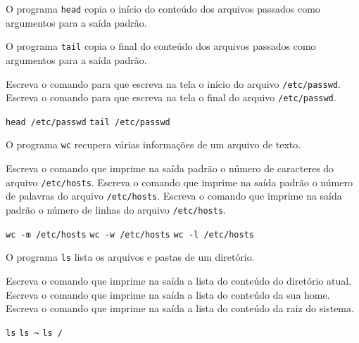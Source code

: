 \begin{Exercise}[label={0015}, difficulty={1}, origin={bash}]
  O programa \lstinline+head+ copia o início do conteúdo dos arquivos passados
  como argumentos para a saída padrão.

  O programa \lstinline+tail+ copia o final do conteúdo dos arquivos passados
  como argumentos para a saída padrão.

  \Question Escreva o comando para que escreva na tela o início do arquivo
  \lstinline+/etc/passwd+.
  \Question Escreva o comando para que escreva na tela o final do arquivo
  \lstinline+/etc/passwd+.
\end{Exercise}
\begin{Answer}[ref={0015}]
  \Question \lstinline+head /etc/passwd+
  \Question \lstinline+tail /etc/passwd+
\end{Answer}

\begin{Exercise}[label={0016}, difficulty={1}, origin={bash}]
  O programa \lstinline+wc+ recupera várias informações de um arquivo de texto.

  \Question Escreva o comando que imprime na saída padrão o número de
  caracteres do arquivo \lstinline+/etc/hosts+.
  \Question Escreva o comando que imprime na saída padrão o número de palavras
  do arquivo \lstinline+/etc/hosts+.
  \Question Escreva o comando que imprime na saída padrão o número de linhas
  do arquivo \lstinline+/etc/hosts+.
\end{Exercise}
\begin{Answer}[ref={0016}]
  \Question \lstinline+wc -m /etc/hosts+
  \Question \lstinline+wc -w /etc/hosts+
  \Question \lstinline+wc -l /etc/hosts+
\end{Answer}

\begin{Exercise}[label={0017}, difficulty={1}, origin={bash}]
  O programa \lstinline+ls+ lista os arquivos e pastas de um diretório.

  \Question Escreva o comando que imprime na saída a lista do conteúdo do
  diretório atual.
  \Question Escreva o comando que imprime na saída a lista do conteúdo da
  sua home.
  \Question Escreva o comando que imprime na saída a lista do conteúdo da
  raiz do sistema.
\end{Exercise}
\begin{Answer}[ref={0017}]
  \Question \lstinline+ls+
  \Question \lstinline+ls ~+
  \Question \lstinline+ls /+
\end{Answer}

